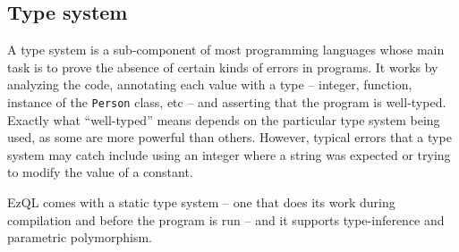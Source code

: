 




\subsection{Type system}
\label{sec:type-system}

A type system is a sub-component of most programming languages whose
main task is to prove the absence of certain kinds of errors in
programs. It works by analyzing the code, annotating each value with a
type -- integer, function, instance of the \verb=Person= class, etc --
and asserting that the program is well-typed. Exactly what
``well-typed'' means depends on the particular type system being used,
as some are more powerful than others. However, typical errors that a
type system may catch include using an integer where a string was
expected or trying to modify the value of a constant.

EzQL comes with a static type system -- one that does its work during
compilation and before the program is run -- and it supports
type-inference and parametric polymorphism.

